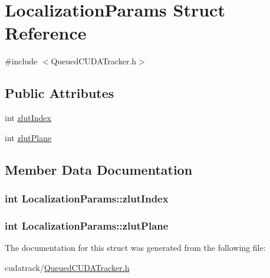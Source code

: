 \hypertarget{struct_localization_params}{}\section{Localization\+Params Struct Reference}
\label{struct_localization_params}


{\ttfamily \#include $<$Queued\+C\+U\+D\+A\+Tracker.\+h$>$}

\subsection*{Public Attributes}
\begin{DoxyCompactItemize}
\item 
int \hyperlink{struct_localization_params_ad7aa3c082a4f5295be937820fb8c58d2}{zlut\+Index}
\item 
int \hyperlink{struct_localization_params_aff5333ada3b2d21903ccef6f47cd9490}{zlut\+Plane}
\end{DoxyCompactItemize}


\subsection{Member Data Documentation}
\subsubsection[{\texorpdfstring{zlut\+Index}{zlutIndex}}]{\setlength{\rightskip}{0pt plus 5cm}int Localization\+Params\+::zlut\+Index}\hypertarget{struct_localization_params_ad7aa3c082a4f5295be937820fb8c58d2}{}\label{struct_localization_params_ad7aa3c082a4f5295be937820fb8c58d2}
\subsubsection[{\texorpdfstring{zlut\+Plane}{zlutPlane}}]{\setlength{\rightskip}{0pt plus 5cm}int Localization\+Params\+::zlut\+Plane}\hypertarget{struct_localization_params_aff5333ada3b2d21903ccef6f47cd9490}{}\label{struct_localization_params_aff5333ada3b2d21903ccef6f47cd9490}


The documentation for this struct was generated from the following file\+:\begin{DoxyCompactItemize}
\item 
cudatrack/\hyperlink{_queued_c_u_d_a_tracker_8h}{Queued\+C\+U\+D\+A\+Tracker.\+h}\end{DoxyCompactItemize}
